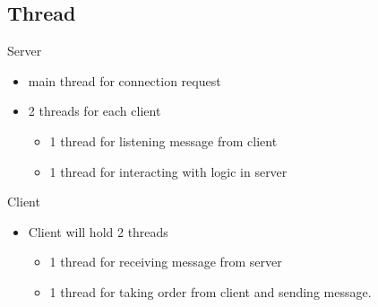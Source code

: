 \documentclass{beamer}
\begin{document}
\subsection{Thread}
	\begin{frame}{Server}
		\begin{itemize}
			\item main thread for connection request
			\item 2 threads for each client
			\begin{itemize}
				\item 1 thread for listening message from client
				\item 1 thread for interacting with logic in server
			\end{itemize}
		\end{itemize}
	\end{frame}

\begin{frame}{Client}
\begin{itemize}
	\item Client will hold 2 threads
	\begin{itemize}
		\item 1 thread for receiving message from server
		\item 1 thread for taking order from client and sending message.
	\end{itemize}
\end{itemize}
\end{frame}
\end{document}
